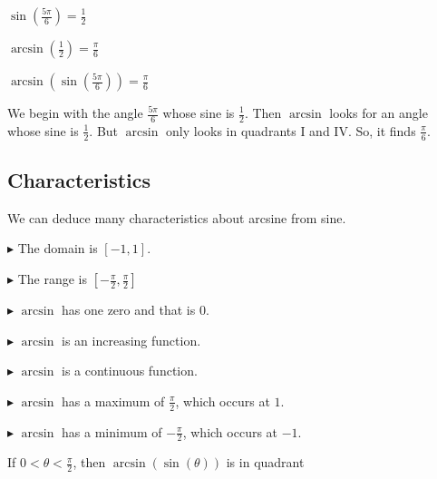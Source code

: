 \documentclass{ximera}
\begin{document}
\begin{example}



$\sin\left(\frac{5\pi}{6}\right) = \frac{1}{2}$

$\arcsin\left(\frac{1}{2}\right) = \frac{\pi}{6}$


$\arcsin\left(\sin\left(\frac{5\pi}{6}\right)\right) = \frac{\pi}{6}$




We begin with the angle $\frac{5\pi}{6}$ whose sine is $\frac{1}{2}$.  Then $\arcsin$ looks for an angle whose sine is $\frac{1}{2}$.  But $\arcsin$ only looks in quadrants I and IV.  So, it finds $\frac{\pi}{6}$.


\end{example}









\subsection*{Characteristics} 

We can deduce many characteristics about arcsine from sine.


$\blacktriangleright$ The domain is  $[-1, 1]$.


$\blacktriangleright$ The range is $\left[ -\frac{\pi}{2}, \frac{\pi}{2} \right]$


$\blacktriangleright$ $\arcsin$ has one zero and that is $0$.


$\blacktriangleright$ $\arcsin$ is an increasing function.

$\blacktriangleright$ $\arcsin$ is a continuous function.

$\blacktriangleright$ $\arcsin$ has a maximum of $\frac{\pi}{2}$, which occurs at $1$.

$\blacktriangleright$ $\arcsin$ has a minimum of $-\frac{\pi}{2}$, which occurs at $-1$.



\begin{question}


If $0 < \theta < \frac{\pi}{2}$, then $\arcsin(\sin(\theta))$ is in quadrant

\begin{multipleChoice}
\end{multipleChoice}

\end{question}
\end{document}
